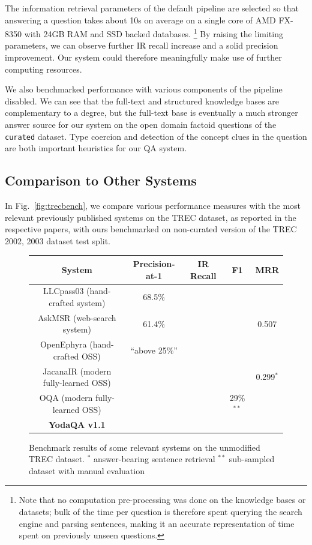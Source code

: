 The information retrieval parameters of the default pipeline are selected so
that answering a question takes about 10s on average on a single core of
AMD FX-8350 with 24GB RAM and SSD backed databases.%
\footnote{Note that no computation pre-processing was done on the knowledge bases or datasets;
bulk of the time per question is therefore spent querying the search engine and parsing sentences,
making it an accurate representation of time spent on previously unseen questions.}
By raising the limiting
parameters, we can observe further IR recall increase and a solid precision improvement.
Our system could therefore meaningfully make use of further computing resources.

We also benchmarked performance with various components of the pipeline
disabled.  We can see that the full-text and structured knowledge bases
are complementary to a degree, but the full-text base is eventually
a much stronger answer source for our system on the open domain factoid
questions of the \texttt{curated} dataset.  Type coercion and detection
of the concept clues in the question are both important heuristics for
our QA system.

\subsection{Comparison to Other Systems}

In Fig.~\ref{fig:trecbench}, we compare various performance measures
with the most relevant previously published systems
on the TREC dataset, as reported in the respective papers,
with ours benchmarked on non-curated version of the TREC 2002, 2003 dataset test split.

\begin{figure}[t]
\centering
\begin{tabular}{|c|cccc|}
\hline
System & Precision-at-1 & IR Recall & F1 & MRR \\ \hline
LLCpass03 \citep{LCC} (hand-crafted system) & 68.5\% & & & \\
AskMSR \citep{AskMSR} (web-search system) & 61.4\% & & & 0.507 \\ \hline
OpenEphyra \citep{Ephyra2006} (hand-crafted OSS) & ``above 25\%'' & & & \\
JacanaIR \citep{TreeEditIR2013Yao} (modern fully-learned OSS) & & & & 0.299$^*$ \\
OQA \citep{OQA} (modern fully-learned OSS) & & & 29\%$^{**}$ & \\ \hline
\textbf{YodaQA v1.1} &  &  &  &  \\
\hline
\end{tabular}
\vspace*{-0.2cm}
\caption{Benchmark results of some relevant systems on the unmodified TREC dataset.\quad
$^*$ answer-bearing sentence retrieval\quad
$^{**}$ sub-sampled dataset with manual evaluation}
\label{fig:bench}
\end{figure}

